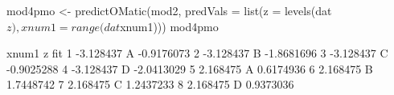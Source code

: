 \begin{Schunk}
\begin{Sinput}
 mod4pmo <- predictOMatic(mod2, predVals = list(z = levels(dat$z), xnum1 = range(dat$xnum1)))
 mod4pmo
\end{Sinput}
\begin{Soutput}
      xnum1 z        fit
1 -3.128437 A -0.9176073
2 -3.128437 B -1.8681696
3 -3.128437 C -0.9025288
4 -3.128437 D -2.0413029
5  2.168475 A  0.6174936
6  2.168475 B  1.7448742
7  2.168475 C  1.2437233
8  2.168475 D  0.9373036
\end{Soutput}
\end{Schunk}
